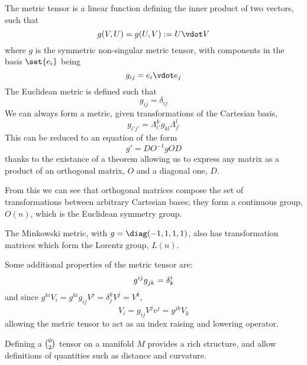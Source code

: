 The metric tensor is a linear function defining the inner product of two vectors, such that
\begin{equation}
  \label{eq:13}
  g(V,U) = g(U,V) := U \vdot V
\end{equation}
where $g$ is the symmetric non-singular metric tensor, with components
in the basis $\set{e_i}$ being
\begin{equation}
  \label{eq:14}
  g_{ij} = e_i \vdot e_j
\end{equation}
The Euclidean metric is defined such that
\[ g_{ij} = \delta_{ij} \]
We can always form a metric, given transformations of the Cartesian basis,
\[ g_{i' j'} = \Lambda^k_{i'} g_{kl} \Lambda^l_{j'} \]
This can be reduced to an equation of the form
\[ g' = D O^{-1} g OD \] thanks to the existance of a theorem allowing
us to express any matrix as a product of an orthogonal matrix, $O$ and
a diagonal one, $D$. 

From this we can see that orthogonal matrices compose the set of
transformations between arbitrary Cartesian bases; they form a
continuous group, $O(n)$, which is the Euclidean symmetry group.

The Minkowski metric, with $g = \diag(-1, 1, 1, 1)$, also has
transformation matrices which form the Lorentz group, $L(n)$.

Some additional properties of the metric tensor are:
\begin{equation}
  \label{eq:15}
  \tensor{g}{^{ij}} \tensor{g}{_{jk}} = \delta^i_k
\end{equation}
and since $g^{ki} V_i = g^{ki} g_{ij} V^j = \delta^k_j V^j = V^k$, 
\begin{subequations}
  \begin{equation}
    \label{eq:16}
    V_i = g_{ij} V^j
  \end{equation}
  \begin{equation}
    \label{eq:17}
    v^j = g^{jk} V_k
  \end{equation}
\end{subequations}
allowing the metric tensor to act as an index raising and lowering
operator.

Defining a $0 \choose 2$ tensor on a manifold $M$ provides a
rich structure, and allow definitions of quantities such as distance
and curvature.
